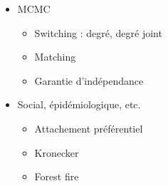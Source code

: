 \documentclass[c]{beamer}
\begin{document}
\begin{frame}
    \begin{itemize}
        \item MCMC
        \begin{itemize}
            \item Switching : degré, degré joint
            \item Matching
            \item Garantie d'indépendance
        \end{itemize}
        \item Social, épidémiologique, etc.
        \begin{itemize}
            \item Attachement préférentiel
            \item Kronecker
            \item Forest fire
        \end{itemize}
    \end{itemize}
\end{frame}
\end{document}

